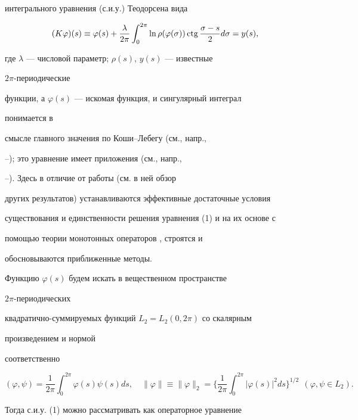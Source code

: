 интегрального уравнения (с.и.у.) Теодорсена вида


\begin{equation}


(K\varphi)(s)\equiv \varphi(s)+\frac{\lambda}{2\pi}


\int^{2\pi}_0 \ln\rho(\varphi(\sigma))\ctg


\frac{\sigma-s}{2}d\sigma=y(s),


\end{equation}


где $\lambda$ --- числовой параметр; $\rho(s)$, $y(s)$ --- известные 


$2\pi$-периодические 


функции, а $\varphi(s)$ --- искомая функция, и сингулярный интеграл 


понимается в 


смысле главного значения по Коши--Лебегу (см., напр., 


\cite{1}--\cite{5}); это уравнение имеет приложения (см., напр., 


\cite{4}--\cite{8}). Здесь в отличие от работы \cite{4} (см. в ней обзор


других результатов) устанавливаются эффективные достаточные условия 


существования и единственности решения уравнения (1) и на их основе с 


помощью теории монотонных операторов \cite{9}, \cite{10} строятся и 


обосновываются приближенные методы.





Функцию $\varphi(s)$ будем искать в вещественном пространстве 


$2\pi$-периодических 


квадратично-суммируемых функций $L_2=L_2(0,2\pi)$ со скалярным 


произведением и нормой 


соответственно


$$


(\varphi,\psi)=\frac{1}{2\pi}\int^{2\pi}_0


\varphi(s)\psi(s)ds,\quad \|\varphi\|\equiv\|\varphi\|_2=


\bigg\{\frac{1}{2\pi}\int^{2\pi}_0 |\varphi(s)|^2ds


\bigg\}^{1/2}\ \ (\varphi,\psi\in L_2).


$$


Тогда с.и.у. (1) можно рассматривать как операторное уравнение


